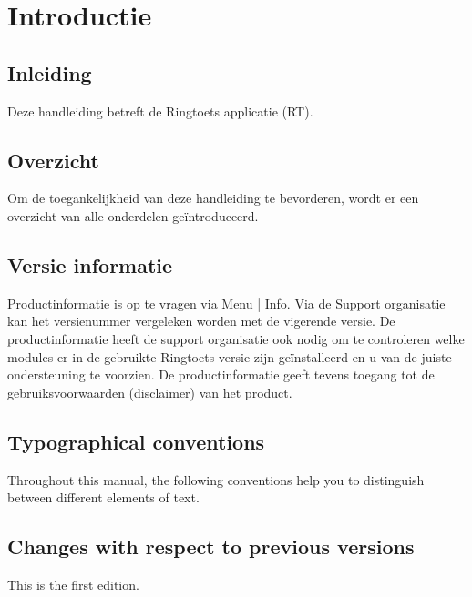 
\chapter{Introductie\label{chap:guide}}

\section{Inleiding}
Deze handleiding betreft de Ringtoets applicatie (RT).

\section{Overzicht}
Om de toegankelijkheid van deze handleiding te bevorderen, wordt er een overzicht van alle onderdelen ge\"{i}ntroduceerd.


\section{Versie informatie}
Productinformatie is op te vragen via Menu | Info. Via de Support organisatie kan het versienummer
vergeleken worden met de vigerende versie. De productinformatie heeft de support
organisatie ook nodig om te controleren welke modules er in de gebruikte Ringtoets versie
zijn geïnstalleerd en u van de juiste ondersteuning te voorzien. De productinformatie geeft
tevens toegang tot de gebruiksvoorwaarden (disclaimer) van het product.

\section{Typographical conventions}
Throughout this manual, the following conventions help you to distinguish between different
elements of text.


\section{Changes with respect to previous versions}
This is the first edition.